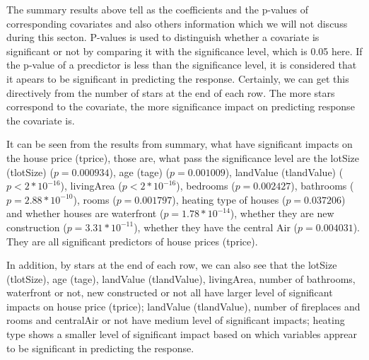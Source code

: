 \documentclass[12pt]{article}
\begin{document}
The summary results above tell as the coefficients and the p-values of corresponding covariates and also others information which we will not discuss during this secton. P-values is used to distinguish whether a covariate is significant or not by comparing it with the significance level, which is 0.05 here. If the p-value of a precdictor is less than the significance level, it is considered that it apears to be significant in predicting the response. Certainly, we can get this directively from the number of stars at the end of each row. The more stars correspond to the covariate, the more significance impact on predicting response the covariate is.

\bigskip{}
\noindent
It can be seen from the results from summary, what have significant impacts on the house price (tprice), those are, what pass the significance level are the lotSize (tlotSize) ($p=0.000934$), age (tage) ($p=0.001009$), landValue (tlandValue) ($p<2*10^{-16}$), livingArea ($p<2*10^{-16}$), bedrooms ($p=0.002427$), bathrooms ($p=2.88*10^{-10}$), rooms ($p=0.001797$), heating type of houses ($p=0.037206$) and whether houses are waterfront ($p=1.78*10^{-14}$), whether they are new construction ($p=3.31*10^{-11}$), whether they have the central Air ($p=0.004031$). They are all significant predictors of house prices (tprice). 

\bigskip{}
\noindent
In addition, by stars at the end of each row, we can also see that the lotSize (tlotSize), age (tage), landValue (tlandValue), livingArea, number of bathrooms, waterfront or not, new constructed or not all have larger level of significant impacts on house price (tprice); landValue (tlandValue), number of fireplaces and rooms and centralAir or not have medium level of significant impacts; heating type shows a smaller level of significant impact based on which variables apprear to be significant in predicting the response.
\end{document}

